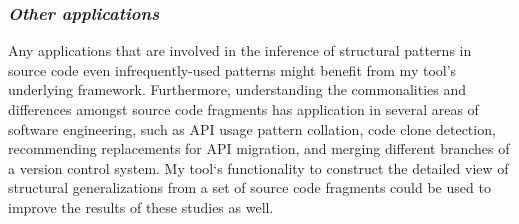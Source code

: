 \subsubsection{\emph{Other applications} }
Any applications that are involved in the inference of structural patterns in source code even infrequently-used patterns might benefit from my tool’s underlying framework.
Furthermore, understanding the commonalities and differences amongst source code fragments has application in several areas of software engineering, such as API usage pattern collation, code clone detection, recommending replacements for API migration, and merging different branches of a version control system. My tool`s functionality to construct the detailed view of structural generalizations from a set of source code fragments could be used to improve the results of these studies as well.



